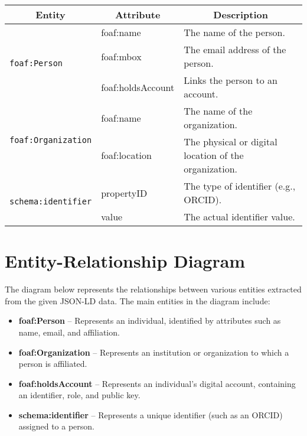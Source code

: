 \documentclass{article}
\begin{document}
\begin{longtable}{|l|l|p{8cm}|}
    \hline
    \multicolumn{1}{|c|}{\textbf{Entity}}   &
    \multicolumn{1}{c|}{\textbf{Attribute}} &
    \multicolumn{1}{c|}{\textbf{Description}}                                                                           \\
    \hline
    \multirow{3}{*}{\texttt{foaf:Person}}
                                            & foaf:name         & The name of the person.                               \\ \cline{2-3}
                                            & foaf:mbox         & The email address of the person.                      \\ \cline{2-3}
                                            & foaf:holdsAccount & Links the person to an account.                       \\
    \hline
    \multirow{2}{*}{\texttt{foaf:Organization}}
                                            & foaf:name         & The name of the organization.                         \\ \cline{2-3}
                                            & foaf:location     & The physical or digital location of the organization. \\
    \hline
    \multirow{2}{*}{\texttt{schema:identifier}}
                                            & propertyID        & The type of identifier (e.g., ORCID).                 \\ \cline{2-3}
                                            & value             & The actual identifier value.                          \\
    \hline
\end{longtable}


\section{Entity-Relationship Diagram}

The diagram below represents the relationships between various entities extracted from the given JSON-LD data. The main entities in the diagram include:

\begin{itemize}
    \item \textbf{foaf:Person} – Represents an individual, identified by attributes such as name, email, and affiliation.
    \item \textbf{foaf:Organization} – Represents an institution or organization to which a person is affiliated.
    \item \textbf{foaf:holdsAccount} – Represents an individual's digital account, containing an identifier, role, and public key.
    \item \textbf{schema:identifier} – Represents a unique identifier (such as an ORCID) assigned to a person.
\end{itemize}
\end{document}
